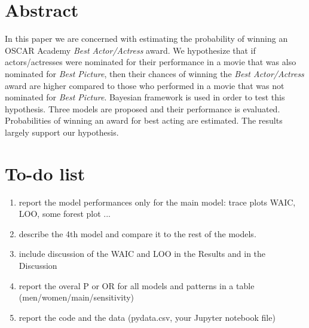 \documentclass[10pt,letterpaper]{article}
\begin{document}
\section*{Abstract}
In this paper we are concerned with estimating the probability of winning an OSCAR Academy \emph{Best Actor/Actress} award. We hypothesize that if actors/actresses were nominated for their performance in a movie that was also nominated for \emph{Best Picture}, then their chances of winning the \emph{Best Actor/Actress} award are higher compared to those who performed in a movie that was not nominated for \emph{Best Picture}. Bayesian framework is used in order to test this hypothesis. Three models are proposed and their performance is evaluated. Probabilities of winning an award for best acting are estimated. The results largely support our hypothesis.




\linenumbers

\section*{To-do list}
\begin{enumerate}
  \item report the model performances only for the main model: trace plots WAIC, LOO, some forest plot ... 
  \item describe the 4th model and compare it to the rest of the models.
  \item include discussion of the WAIC and LOO in the Results and in the Discussion
  \item report the overal P or OR for all models and patterns in a table (men/women/main/sensitivity)
  \item report the code and the data (pydata.csv, your Jupyter notebook file)
\end{enumerate}
\end{document}
